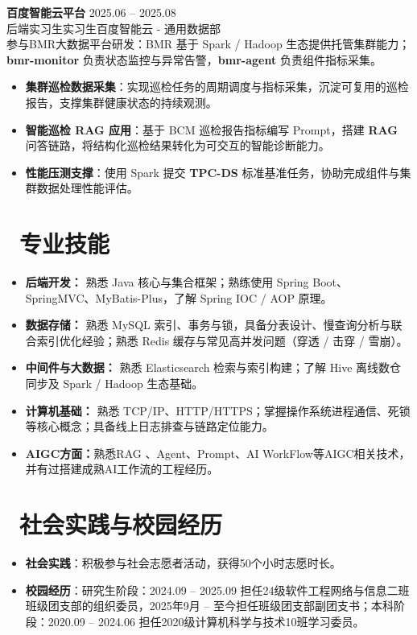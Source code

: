\documentclass[11pt]{article}
\newlength{\interProjectSpacing}
\newcommand{\projectsep}{\vspace{\interProjectSpacing}}
\newlength{\intraProjectTitleSep}
\newcommand{\titlebreak}{\\[\intraProjectTitleSep]}
\newlength{\intraProjectListTopSep}
\begin{document}
\projectsep

\textbf{百度智能云平台} \hfill 2025.06 -- 2025.08 \titlebreak
后端实习生实习生\quad 百度智能云 - 通用数据部\\[0.2em]
参与BMR大数据平台研发：BMR 基于 Spark / Hadoop 生态提供托管集群能力；\textbf{bmr-monitor} 负责状态监控与异常告警，\textbf{bmr-agent} 负责组件指标采集。
\begin{itemize}[nosep, topsep=\intraProjectListTopSep]
  \item \textbf{集群巡检数据采集}：实现巡检任务的周期调度与指标采集，沉淀可复用的巡检报告，支撑集群健康状态的持续观测。
  \item \textbf{智能巡检 RAG 应用}：基于 BCM 巡检报告指标编写 Prompt，搭建 \textbf{RAG} 问答链路，将结构化巡检结果转化为可交互的智能诊断能力。
  \item \textbf{性能压测支撑}：使用 Spark 提交 \textbf{TPC-DS} 标准基准任务，协助完成组件与集群数据处理性能评估。
\end{itemize}

\section{\makebox[\widthof{\faCogs}][c]{\color{CVBlue}\faCogs}\ 专业技能}
\begin{itemize}[nosep]
  \item \textbf{后端开发：} 熟悉 Java 核心与集合框架；熟练使用 Spring Boot、SpringMVC、MyBatis-Plus，了解 Spring IOC / AOP 原理。
  \item \textbf{数据存储：} 熟悉 MySQL 索引、事务与锁，具备分表设计、慢查询分析与联合索引优化经验；熟悉 Redis 缓存与常见高并发问题（穿透 / 击穿 / 雪崩）。
  \item \textbf{中间件与大数据：} 熟悉 Elasticsearch 检索与索引构建；了解 Hive 离线数仓同步及 Spark / Hadoop 生态基础。
  \item \textbf{计算机基础：} 熟悉 TCP/IP、HTTP/HTTPS；掌握操作系统进程通信、死锁等核心概念；具备线上日志排查与链路定位能力。
  \item \textbf{AIGC方面：}熟悉RAG 、Agent、Prompt、AI WorkFlow等AIGC相关技术，并有过搭建成熟AI工作流的工程经历。
\end{itemize}
\section{\makebox[\widthof{\faUsers}][c]{\color{CVBlue}\faUsers}\ 社会实践与校园经历}
\begin{itemize}[nosep]
  \item \textbf{社会实践}：积极参与社会志愿者活动，获得50个小时志愿时长。
  \item \textbf{校园经历}：研究生阶段：2024.09 -- 2025.09 担任24级软件工程网络与信息二班班级团支部的组织委员，2025年9月 -- 至今担任班级团支部副团支书；本科阶段：2020.09 -- 2024.06 担任2020级计算机科学与技术10班学习委员。
\end{itemize}
\end{document}
